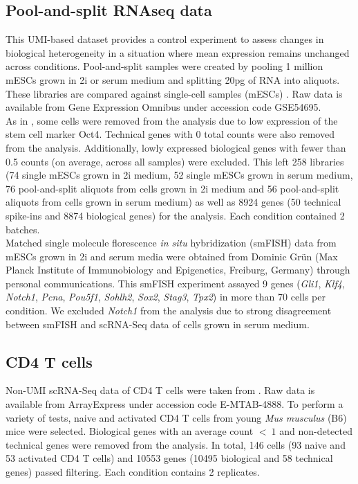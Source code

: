 \subsection{Pool-and-split RNAseq data} \label{seq::data_PaS}

This UMI-based dataset provides a control experiment to assess changes in biological heterogeneity in a situation where mean expression remains unchanged across conditions. Pool-and-split samples were created by pooling 1 million mESCs grown in 2i or serum medium and splitting 20pg of RNA into aliquots. These libraries are compared against single-cell samples (mESCs) \citep{Grun2014}. Raw data is available from Gene Expression Omnibus under accession code GSE54695. \\

As in \cite{Grun2014}, some cells were removed from the analysis due to low expression of the stem cell marker Oct4. Technical genes with 0 total counts were also removed from the analysis. Additionally, lowly expressed biological genes with fewer than 0.5 counts (on average, across all samples) were excluded. This left 258 libraries (74 single mESCs grown in 2i medium, 52 single mESCs grown in serum medium, 76 pool-and-split aliquots from cells grown in 2i medium and 56 pool-and-split aliquots from cells grown in serum medium) as well as 8924 genes (50 technical spike-ins and 8874 biological genes) for the analysis. Each condition contained 2 batches.\\

Matched single molecule florescence \textit{in situ} hybridization (smFISH) data from mESCs grown in 2i and serum media were obtained from Dominic Gr\"un (Max Planck Institute of Immunobiology and Epigenetics, Freiburg, Germany) through personal communications. This smFISH experiment assayed 9 genes (\textit{Gli1}, \textit{Klf4}, \textit{Notch1}, \textit{Pcna}, \textit{Pou5f1}, \textit{Sohlh2}, \textit{Sox2}, \textit{Stag3}, \textit{Tpx2}) in more than 70 cells per condition. We excluded \textit{Notch1} from the analysis due to strong disagreement between smFISH and scRNA-Seq data of cells grown in serum medium.

\subsection{CD4\plus{} T cells} \label{seq::data_cd4}

Non-UMI scRNA-Seq data of CD4\plus{} T cells were taken from \cite{Martinez-jimenez2017}. Raw data is available from ArrayExpress under accession code E-MTAB-4888. To perform a variety of tests, naive and activated CD4\plus{} T cells from young \emph{Mus musculus} (B6) mice were selected. Biological genes with an average count $<~1$ and non-detected technical genes were removed from the analysis. In total, 146 cells (93 naive and 53 activated CD4\plus{} T cells) and 10553 genes (10495 biological and 58 technical genes) passed filtering. Each condition contains 2 replicates.

